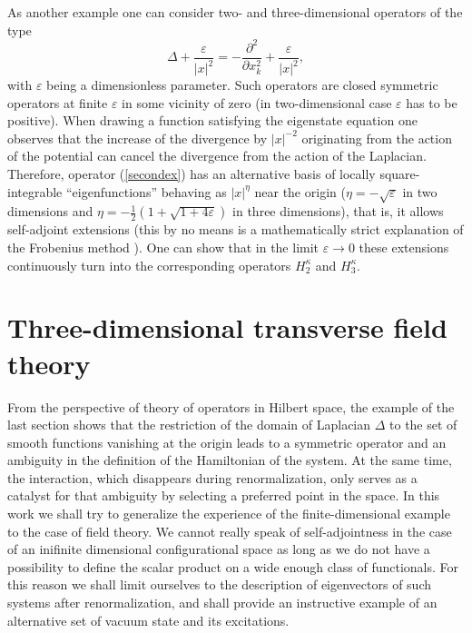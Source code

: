 \documentclass[12pt]{article}
\newcommand{\Hh}{H}
\newcommand{\ve}{\varepsilon}
\begin{document}
	As another example one can consider two- and three-dimensional
    operators of the type
\begin{equation}
\label{secondex}
    \Delta + \frac{\ve}{|x|^{2}} =
	-\frac{\partial^{2}}{\partial x_{k}^{2}} + \frac{\ve}{|x|^{2}},
\end{equation}
	with
$ \ve $ being a dimensionless parameter.
	Such operators are closed symmetric operators at finite
$ \ve $
	in some vicinity of zero (in two-dimensional case
$ \ve $ has to be positive).
	When drawing a function satisfying the eigenstate equation
	one observes that the increase of the divergence by
$ |x|^{-2} $
	originating from the action of the potential can cancel the
	divergence from the action of the Laplacian.
	Therefore, operator
(\ref{secondex})
	has an alternative basis of locally square-integrable
	``eigenfunctions'' behaving as
$ |x|^{\eta} $
	near the origin
($ \eta = -\sqrt{\ve} $ in two dimensions and
$ \eta = -\frac{1}{2}(1+\sqrt{1+4\ve}) $ in three dimensions),
	that is, it allows self-adjoint extensions
	(this by no means is a mathematically strict explanation
    of the Frobenius method
\cite{Frobenius}).
	One can show that in the limit
$ \ve \to 0 $
	these extensions continuously turn into the corresponding operators
$ \Hh_{2}^{\kappa} $ and
$ \Hh_{3}^{\kappa} $.




\section{Three-dimensional transverse field theory}
	From the perspective of theory of operators in Hilbert space,
	the example of the last section shows that the restriction of the
	domain of Laplacian
$ \Delta $
	to the set of smooth functions vanishing at the origin
	leads to a symmetric operator and an ambiguity in the definition
	of the Hamiltonian of the system.
    At the same time, the interaction, which disappears during
    renormalization,
    only serves as a catalyst for that ambiguity by selecting a preferred
    point in the space.
    In this work we shall try to generalize the experience of the
    finite-dimensional example to the case of field theory.
    We cannot really speak of self-adjointness
    in the case of an inifinite dimensional configurational space
    as long as we do not have a possibility to define the scalar product
    on a wide enough class of functionals.
    For this reason we shall limit ourselves to the description
    of eigenvectors of such systems after renormalization,
    and shall provide an instructive example of an alternative set
    of vacuum state and its excitations.
\end{document}
